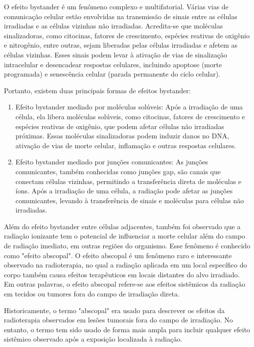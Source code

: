 \documentclass[11pt,a4paper]{article}
\begin{document}
	O efeito bystander é um fenômeno complexo e multifatorial. Várias vias de comunicação celular estão envolvidas na transmissão de sinais entre as células irradiadas e as células vizinhas não irradiadas. Acredita-se que moléculas sinalizadoras, como citocinas, fatores de crescimento, espécies reativas de oxigênio e nitrogênio, entre outras, sejam liberadas pelas células irradiadas e afetem as células vizinhas. Esses sinais podem levar à ativação de vias de sinalização intracelular e desencadear respostas celulares, incluindo apoptose (morte programada) e senescência celular (parada permanente do ciclo celular).

	Portanto, existem duas principais formas de efeitos bystander:

	\begin{enumerate}
		\item Efeito bystander mediado por moléculas solúveis: Após a irradiação de uma célula, ela libera moléculas solúveis, como citocinas, fatores de crescimento e espécies reativas de oxigênio, que podem afetar células não irradiadas próximas. Essas moléculas sinalizadoras podem induzir danos no DNA, ativação de vias de morte celular, inflamação e outras respostas celulares.
		\item Efeito bystander mediado por junções comunicantes: As junções comunicantes, também conhecidas como junções gap, são canais que conectam células vizinhas, permitindo a transferência direta de moléculas e íons. Após a irradiação de uma célula, a radiação pode afetar as junções comunicantes, levando à transferência de sinais e moléculas para células não irradiadas.
	\end{enumerate}


	Além do efeito bystander entre células adjacentes, também foi observado que a radiação ionizante tem o potencial de influenciar a morte celular além do campo de radiação imediato, em outras regiões do organismo. Esse fenômeno é conhecido como "efeito abscopal". O efeito abscopal é um fenômeno raro e interessante observado na radioterapia, no qual a radiação aplicada em um local específico do corpo também causa efeitos terapêuticos em locais distantes do alvo irradiado. Em outras palavras, o efeito abscopal refere-se aos efeitos sistêmicos da radiação em tecidos ou tumores fora do campo de irradiação direta.

	Historicamente, o termo "abscopal" era usado para descrever os efeitos da radioterapia observados em lesões tumorais fora do campo de irradiação. No entanto, o termo tem sido usado de forma mais ampla para incluir qualquer efeito sistêmico observado após a exposição localizada à radiação.
	
\end{document}
